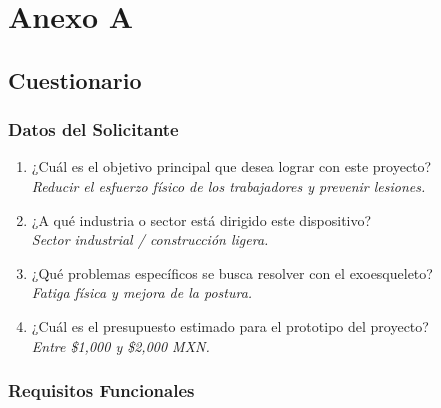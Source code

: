 


\chapter{Anexo A}
\section{Cuestionario}
\subsection{Datos del Solicitante}

\begin{enumerate}
    \item ¿Cuál es el objetivo principal que desea lograr con este proyecto? \\
    \textit{Reducir el esfuerzo físico de los trabajadores y prevenir lesiones.}
    
    \item ¿A qué industria o sector está dirigido este dispositivo? \\
    \textit{Sector industrial / construcción ligera.}
    
    \item ¿Qué problemas específicos se busca resolver con el exoesqueleto? \\
    \textit{Fatiga física y mejora de la postura.}
    
    \item ¿Cuál es el presupuesto estimado para el prototipo del proyecto? \\
    \textit{Entre \$1,000 y \$2,000 MXN.}
\end{enumerate}

\subsection{Requisitos Funcionales}

